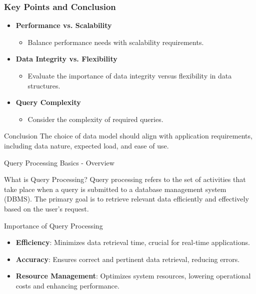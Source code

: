 \documentclass[aspectratio=169]{beamer}
\begin{document}
\begin{frame}[fragile]
    \frametitle{Key Points and Conclusion}
    \begin{itemize}
        \item \textbf{Performance vs. Scalability}
            \begin{itemize}
                \item Balance performance needs with scalability requirements.
            \end{itemize}
        \item \textbf{Data Integrity vs. Flexibility}
            \begin{itemize}
                \item Evaluate the importance of data integrity versus flexibility in data structures.
            \end{itemize}
        \item \textbf{Query Complexity}
            \begin{itemize}
                \item Consider the complexity of required queries.
            \end{itemize}
    \end{itemize}
    \begin{block}{Conclusion}
        The choice of data model should align with application requirements, including data nature, expected load, and ease of use.
    \end{block}
\end{frame}

\begin{frame}[fragile]{Query Processing Basics - Overview}
    \begin{block}{What is Query Processing?}
        Query processing refers to the set of activities that take place when a query is submitted to a database management system (DBMS). The primary goal is to retrieve relevant data efficiently and effectively based on the user’s request.
    \end{block}
    
    \begin{block}{Importance of Query Processing}
        \begin{itemize}
            \item \textbf{Efficiency}: Minimizes data retrieval time, crucial for real-time applications.
            \item \textbf{Accuracy}: Ensures correct and pertinent data retrieval, reducing errors.
            \item \textbf{Resource Management}: Optimizes system resources, lowering operational costs and enhancing performance.
        \end{itemize}
    \end{block}
\end{frame}
\end{document}
